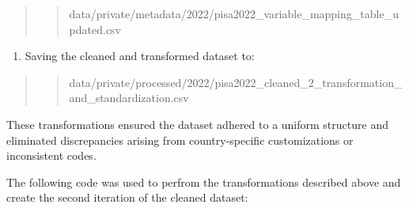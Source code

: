 \documentclass[
]{article}
\providecommand{\tightlist}{%
  \setlength{\itemsep}{0pt}\setlength{\parskip}{0pt}}
\begin{document}
\begin{quote}
\begin{quote}
data/private/metadata/2022/pisa2022\_variable\_mapping\_table\_updated.csv
\end{quote}
\end{quote}

\begin{enumerate}
\def\labelenumi{\arabic{enumi}.}
\setcounter{enumi}{3}
\tightlist
\item
  Saving the cleaned and transformed dataset to:
\end{enumerate}

\begin{quote}
\begin{quote}
data/private/processed/2022/pisa2022\_cleaned\_2\_transformation\_and\_standardization.csv
\end{quote}
\end{quote}

These transformations ensured the dataset adhered to a uniform structure
and eliminated discrepancies arising from country-specific
customizations or inconsistent codes.

The following code was used to perfrom the transformations described
above and create the second iteration of the cleaned dataset:
\end{document}
